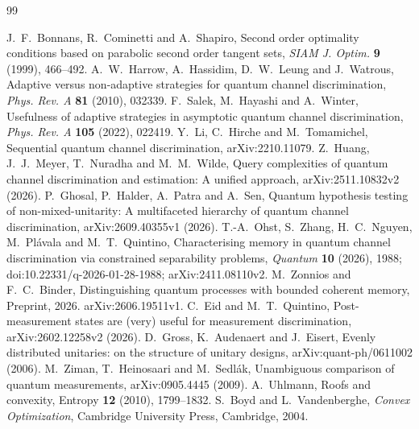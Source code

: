 \begin{thebibliography}{99}

 J.~F.~Bonnans, R.~Cominetti and A.~Shapiro,
Second order optimality conditions based on parabolic second order
tangent sets, \emph{SIAM J. Optim.} \textbf{9} (1999), 466--492.
 A.~W.~Harrow, A.~Hassidim, D.~W.~Leung and J.~Watrous,
Adaptive versus non-adaptive strategies for quantum channel
discrimination, \emph{Phys. Rev. A} \textbf{81} (2010), 032339.
 F.~Salek, M.~Hayashi and A.~Winter,
Usefulness of adaptive strategies in asymptotic quantum channel
discrimination, \emph{Phys. Rev. A} \textbf{105} (2022), 022419.
 Y.~Li, C.~Hirche and M.~Tomamichel,
Sequential quantum channel discrimination, arXiv:2210.11079.
 Z.~Huang, J.~J.~Meyer, T.~Nuradha and M.~M.~Wilde,
Query complexities of quantum channel discrimination and estimation:
A unified approach, arXiv:2511.10832v2 (2026).
 P.~Ghosal, P.~Halder, A.~Patra and A.~Sen,
Quantum hypothesis testing of non-mixed-unitarity: A multifaceted
hierarchy of quantum channel discrimination, arXiv:2609.40355v1 (2026).
 T.-A.~Ohst, S.~Zhang, H.~C.~Nguyen,
M.~Pl\'avala and M.~T.~Quintino,
Characterising memory in quantum channel discrimination via
constrained separability problems,
\emph{Quantum} \textbf{10} (2026), 1988;
doi:10.22331/q-2026-01-28-1988; arXiv:2411.08110v2.
 M.~Zonnios and F.~C.~Binder,
Distinguishing quantum processes with bounded coherent memory,
Preprint, 2026. arXiv:2606.19511v1.
 C.~Eid and M.~T.~Quintino,
Post-measurement states are (very) useful for measurement discrimination,
arXiv:2602.12258v2 (2026).
 D.~Gross, K.~Audenaert and J.~Eisert,
Evenly distributed unitaries: on the structure of unitary designs,
arXiv:quant-ph/0611002 (2006).
 M.~Ziman, T.~Heinosaari and M.~Sedl\'ak,
Unambiguous comparison of quantum measurements,
arXiv:0905.4445 (2009).
 A.~Uhlmann, Roofs and convexity,
Entropy \textbf{12} (2010), 1799--1832.
 S.~Boyd and L.~Vandenberghe, \emph{Convex Optimization},
Cambridge University Press, Cambridge, 2004.
\end{thebibliography}
